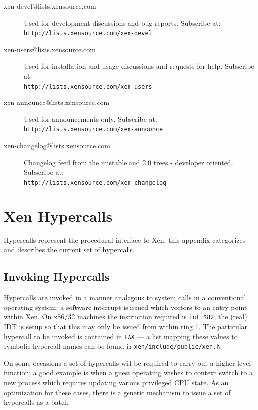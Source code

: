\documentclass[11pt,twoside,final,openright,a4paper]{report}
\begin{document}
\begin{description}
\item[xen-devel@lists.xensource.com] Used for development
  discussions and bug reports.  Subscribe at: \\
  {\small {\tt http://lists.xensource.com/xen-devel}}
\item[xen-users@lists.xensource.com] Used for installation and usage
  discussions and requests for help.  Subscribe at: \\
  {\small {\tt http://lists.xensource.com/xen-users}}
\item[xen-announce@lists.xensource.com] Used for announcements only.
  Subscribe at: \\
  {\small {\tt http://lists.xensource.com/xen-announce}}
\item[xen-changelog@lists.xensource.com] Changelog feed
  from the unstable and 2.0 trees - developer oriented.  Subscribe at: \\
  {\small {\tt http://lists.xensource.com/xen-changelog}}
\end{description}

\appendix


\chapter{Xen Hypercalls}
\label{a:hypercalls}

Hypercalls represent the procedural interface to Xen; this appendix 
categorizes and describes the current set of hypercalls. 

\section{Invoking Hypercalls} 

Hypercalls are invoked in a manner analogous to system calls in a
conventional operating system; a software interrupt is issued which
vectors to an entry point within Xen. On x86/32 machines the
instruction required is {\tt int \$82}; the (real) IDT is setup so
that this may only be issued from within ring 1. The particular 
hypercall to be invoked is contained in {\tt EAX} --- a list 
mapping these values to symbolic hypercall names can be found 
in {\tt xen/include/public/xen.h}. 

On some occasions a set of hypercalls will be required to carry
out a higher-level function; a good example is when a guest 
operating wishes to context switch to a new process which 
requires updating various privileged CPU state. As an optimization
for these cases, there is a generic mechanism to issue a set of 
hypercalls as a batch: 
\end{document}
